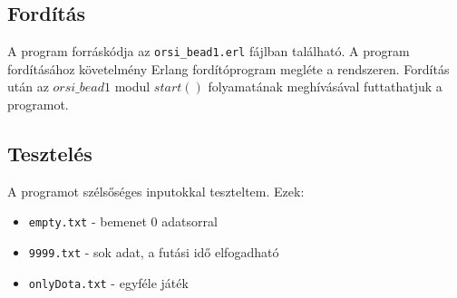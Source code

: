 \documentclass{article}
\begin{document}
	\subsection{Fordítás}
	A program forráskódja az \texttt{orsi\_bead1.erl} fájlban található. A program fordításához
	követelmény Erlang fordítóprogram megléte a rendszeren. Fordítás után az \(orsi\_bead1\) modul \(start()\) folyamatának meghívásával futtathatjuk a programot.
	
	\subsection{Tesztelés}
	A programot szélsőséges inputokkal teszteltem. Ezek:
	\begin{itemize}
		\item \texttt{empty.txt} - bemenet 0 adatsorral
		\item \texttt{9999.txt} - sok adat, a futási idő elfogadható
		\item \texttt{onlyDota.txt} - egyféle játék 
	\end{itemize}
	
\end{document}
